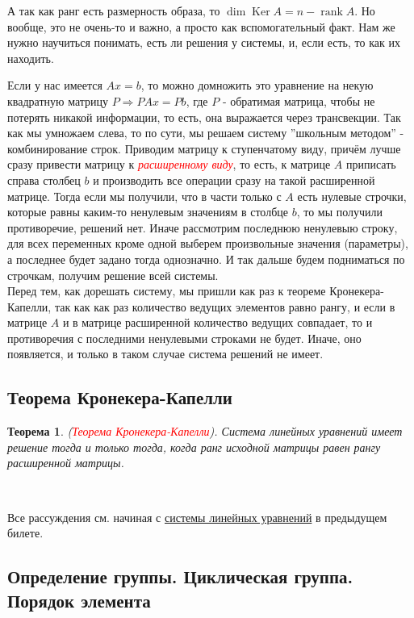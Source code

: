 \documentclass[a4paper,100pt]{article}
\theoremstyle{indented}
\newtheorem{theorem}{Теорема}
\theoremstyle{definition}
\theoremstyle{remark}
\DeclareMathOperator{\Ker}{Ker}
\DeclareMathOperator{\rank}{rank}
\begin{document}
А так как ранг есть размерность образа, то $\dim \Ker A = n - \rank A$. Но вообще, это не очень-то и важно, а просто как вспомогательный факт. Нам же нужно научиться понимать, есть ли решения у системы, и, если есть, то как их находить.\ 

Если у нас имеется $Ax=b$, то можно домножить это уравнение на некую квадратную матрицу $P \Rightarrow PAx=Pb$, где $P$ - обратимая матрица, чтобы не потерять никакой информации, то есть, она выражается через трансвекции. Так как мы умножаем слева, то по сути, мы решаем систему ''школьным методом'' - комбинирование строк. Приводим матрицу к ступенчатому виду, причём лучше сразу привести матрицу к \hypertarget{n64}{\textcolor{red}{\textit{расширенному виду}}}, то есть, к матрице $A$ приписать справа столбец $b$ и производить все операции сразу на такой расширенной матрице. Тогда если мы получили, что в части только с $A$ есть нулевые строчки, которые равны каким-то ненулевым значениям в столбце $b$, то мы получили противоречие, решений нет. Иначе рассмотрим последнюю ненулевыю строку, для всех переменных кроме одной выберем произвольные значения (параметры), а последнее будет задано тогда однозначно. И так дальше будем подниматься по строчкам, получим решение всей системы.\\

Перед тем, как дорешать систему, мы пришли как раз к теореме Кронекера-Капелли, так как как раз количество ведущих элементов равно рангу, и если в матрице $A$ и в матрице расширенной количество ведущих совпадает, то и противоречия с последними ненулевыми строками не будет. Иначе, оно появляется, и только в таком случае система решений не имеет.

\resetall

\subsection{Теорема Кронекера-Капелли}

\begin{theorem}
    (\hypertarget{n65}{\textcolor{red}{\textit{Теорема Кронекера-Капелли}}}). Система линейных уравнений имеет решение тогда и только тогда, когда ранг исходной матрицы равен рангу расширенной матрицы.
\end{theorem}\

Все рассуждения см. начиная с \hyperlink{n54}{системы линейных уравнений} в предыдущем билете.

\resetall

\subsection{Определение группы. Циклическая группа. Порядок элемента}
\end{document}

